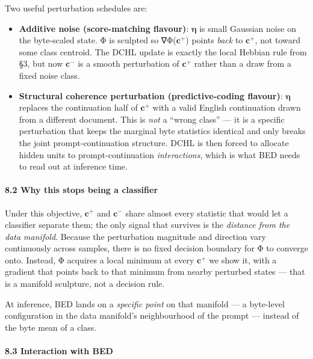 \documentclass[
  11pt,
  a4paper,
]{article}
\providecommand{\tightlist}{%
  \setlength{\itemsep}{0pt}\setlength{\parskip}{0pt}}
\begin{document}
Two useful perturbation schedules are:

\begin{itemize}
\tightlist
\item
  \textbf{Additive noise (score-matching flavour)}:
  \(\boldsymbol{\eta}\) is small Gaussian noise on the byte-scaled
  state. Φ is sculpted so ∇Φ(\(\mathbf{c}^{+}\)) points \emph{back} to
  \(\mathbf{c}^{+}\), not toward some class centroid. The DCHL update is
  exactly the local Hebbian rule from §3, but now \(\mathbf{c}^{-}\) is
  a smooth perturbation of \(\mathbf{c}^{+}\) rather than a draw from a
  fixed noise class.
\item
  \textbf{Structural coherence perturbation (predictive-coding
  flavour)}: \(\boldsymbol{\eta}\) replaces the continuation half of
  \(\mathbf{c}^{+}\) with a valid English continuation drawn from a
  different document. This is \emph{not} a ``wrong class'' --- it is a
  specific perturbation that keeps the marginal byte statistics
  identical and only breaks the joint prompt-continuation structure.
  DCHL is then forced to allocate hidden units to prompt-continuation
  \emph{interactions}, which is what BED needs to read out at inference
  time.
\end{itemize}

\paragraph{8.2 Why this stops being a
classifier}\label{why-this-stops-being-a-classifier}

Under this objective, \(\mathbf{c}^{+}\) and \(\mathbf{c}^{-}\) share
almost every statistic that would let a classifier separate them; the
only signal that survives is the \emph{distance from the data manifold}.
Because the perturbation magnitude and direction vary continuously
across samples, there is no fixed decision boundary for Φ to converge
onto. Instead, Φ acquires a local minimum at every \(\mathbf{c}^{+}\) we
show it, with a gradient that points back to that minimum from nearby
perturbed states --- that is a manifold sculpture, not a decision rule.

At inference, BED lands on a \emph{specific point} on that manifold ---
a byte-level configuration in the data manifold's neighbourhood of the
prompt --- instead of the byte mean of a class.

\paragraph{8.3 Interaction with BED}\label{interaction-with-bed}
\end{document}
